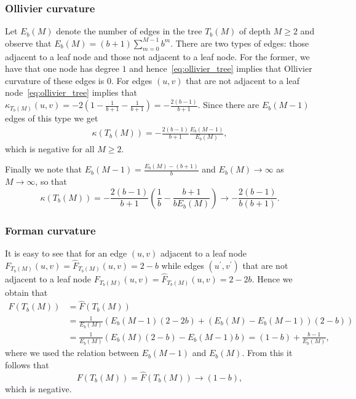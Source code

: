 \documentclass[runningheads]{llncs}
\newcommand{\ch}[1]{{\color{red} #1}}
\begin{document}
\subsubsection{Ollivier curvature} 

\ch{Let $E_b(M)$ denote the number of edges in the tree $T_b(M)$ of depth $M \ge 2$ and observe that $E_b(M) = (b+1) \sum_{m =0}^{M-1} b^m$. There are two types of edges: those adjacent to a leaf node and those not adjacent to a leaf node. For the former, we have that one node has degree $1$ and hence~\eqref{eq:ollivier_tree} implies that Ollivier curvature of these edges is $0$. For edges $(u,v)$ that are not adjacent to a leaf node~\eqref{eq:ollivier_tree} implies that $\kappa_{T_b(M)}(u,v) = -2 \left(1 - \frac{1}{b+1} - \frac{1}{b+1} \right) = -\frac{2(b-1)}{b+1}$. Since there are $E_b(M-1)$ edges of this type we get
\begin{align*}
	\kappa(T_b(M)) = -\frac{2(b-1)}{b+1}\frac{E_b(M-1)}{E_b(M)},
\end{align*}
which is negative for all $M \ge 2$.

Finally we note that $E_b(M-1) = \frac{E_b(M) - (b+1)}{b}$ and $E_b(M) \to \infty$ as $M \to \infty$, so that
\[
	\kappa(T_b(M)) = -\frac{2(b-1)}{b+1} \left(\frac{1}{b} - \frac{b+1}{b E_b(M)}\right) \to -\frac{2(b-1)}{b(b+1)}.
\]
}


\subsubsection{Forman curvature} 
\ch{It is easy to see that for an edge $(u,v)$ adjacent to a leaf node $F_{T_b(M)}(u,v) = \hat{F}_{T_b(M)}(u,v) = 2 - b$ while edges $(u^\prime, v^\prime)$ that are not adjacent to a leaf node $F_{T_b(M)}(u,v) = \hat{F}_{T_b(M)}(u,v) = 2 - 2b$. Hence we obtain that
\begin{align*}
	F(T_b(M)) &= \hat{F}(T_b(M)) \\
	&= \frac{1}{E_b(M)} \left(E_b(M-1)(2-2b) + (E_b(M) - E_b(M-1))(2-b)\right)\\
	&= \frac{1}{E_b(M)} \left(E_b(M)(2-b) - E_b(M-1) b\right) = (1-b) + \frac{b-1}{E_b(M)},
\end{align*}
where we used the relation between $E_b(M-1)$ and $E_b(M)$. From this it follows that
\[
	F(T_b(M)) = \hat{F}(T_b(M)) \to (1-b),
\]
which is negative.}
\end{document}
